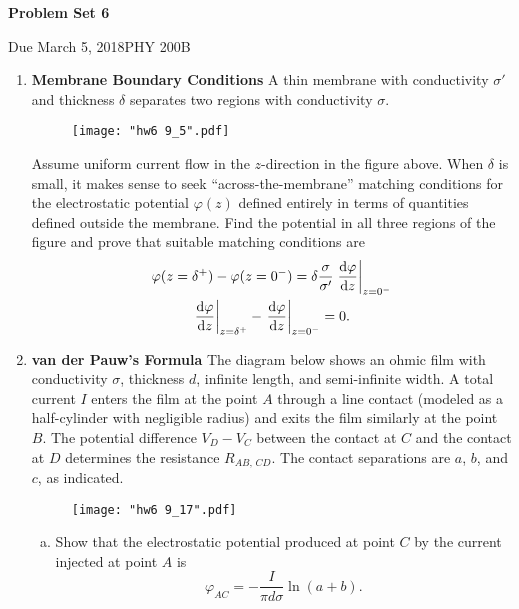 \documentclass{article}
\newcommand{\Title}     {Problem Set 6}
\newcommand{\DueDate}   {March 5, 2018}
\newcommand{\Course}    {PHY 200B}
\begin{document}
{\huge\textbf{\Title}}

Due \DueDate \hfill \Course

\hrulefill

\begin{enumerate}[align=parleft,labelsep=20pt]
    \item [\textbf{9.5 }] \textbf{Membrane Boundary Conditions } A thin membrane with conductivity $\sigma'$ and thickness $\delta$ separates two regions with conductivity $\sigma$.
    \begin{figure}[H]
    \centering
    \texttt{[image: "hw6 9\_5".pdf]}
    \end{figure}
    Assume uniform current flow in the $z$-direction in the figure above. When $\delta$ is small, it makes sense to seek ``across-the-membrane'' matching conditions for the electrostatic potential $\varphi(z)$ defined entirely in terms of quantities defined outside the membrane. Find the potential in all three regions of the figure and prove that suitable matching conditions are
    \begin{gather*}
        \varphi(z=\delta^+) - \varphi(z=0^-) = \delta \frac{\sigma}{\sigma'} \eval{\dv{\varphi}{z}}_{z=0^-} \\
        \eval{\dv{\varphi}{z}}_{z=\delta^+} - \eval{\dv{\varphi}{z}}_{z=0^-} = 0.
    \end{gather*}

    \item [\textbf{9.17 }] \textbf{van der Pauw's Formula } The diagram below shows an ohmic film with conductivity $\sigma$, thickness $d$, infinite length, and semi-infinite width. A total current $I$ enters the film at the point $A$ through a line contact (modeled as a half-cylinder with negligible radius) and exits the film similarly at the point $B$. The potential difference $V_D - V_C$ between the contact at $C$ and the contact at $D$ determines the resistance $R_{AB,\,CD}$. The contact separations are $a$, $b$, and $c$, as indicated. 
    \begin{figure}[H]
    \centering
    \texttt{[image: "hw6 9\_17".pdf]}
    \end{figure}
    \begin{enumerate}[(a), align=parleft,labelsep=20pt]
        \item Show that the electrostatic potential produced at point $C$ by the current injected at point $A$ is
        \[
            \varphi_{AC} = -\frac{I}{\pi d\sigma}\ln(a+b).
        \]


\end{enumerate}
\end{enumerate}
\end{document}
